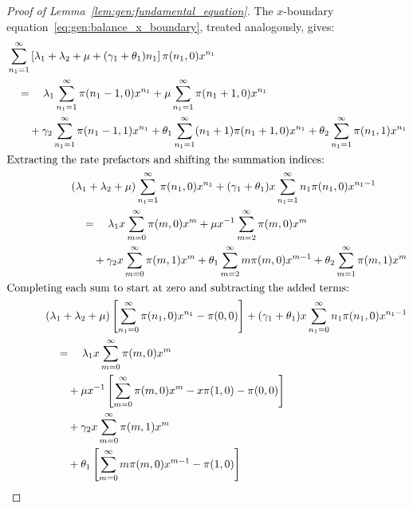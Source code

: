 \begin{proof}[Proof of Lemma~\ref{lem:gen:fundamental_equation}]
    The $x$-boundary equation~\eqref{eq:gen:balance_x_boundary}, treated analogously, gives:
    \begin{align}
        \begin{split}
            & \sum_{n_1=1}^{\infty} \left[ \lambda_1 + \lambda_2 + \mu + (\gamma_1 + \theta_1) n_1 \right] \pi(n_1, 0) x^{n_1} \\
            & \quad = \quad \lambda_1 \sum_{n_1=1}^{\infty} \pi(n_1-1,0) x^{n_1}
            + \mu \sum_{n_1=1}^{\infty} \pi(n_1+1,0) x^{n_1} \\
            & \quad \quad + \gamma_2 \sum_{n_1=1}^{\infty} \pi(n_1-1, 1) x^{n_1}
            + \theta_1 \sum_{n_1=1}^{\infty} (n_1+1) \pi(n_1+1, 0) x^{n_1}
            + \theta_2 \sum_{n_1=1}^{\infty} \pi(n_1, 1) x^{n_1}
        \end{split} \nonumber \\
        \intertext{Extracting the rate prefactors and shifting the summation indices:}
        \begin{split}
            & (\lambda_1 + \lambda_2 + \mu) \sum_{n_1=1}^{\infty} \pi(n_1, 0) x^{n_1}
            + (\gamma_1 + \theta_1) x \sum_{n_1=1}^{\infty} n_1 \pi(n_1, 0) x^{n_1-1} \\
            & \quad = \quad \lambda_1 x \sum_{m=0}^{\infty} \pi(m, 0) x^{m}
            + \mu x^{-1} \sum_{m=2}^{\infty} \pi(m, 0) x^{m} \\
            & \quad \quad + \gamma_2 x \sum_{m=0}^{\infty} \pi(m, 1) x^{m}
            + \theta_1 \sum_{m=2}^{\infty} m \pi(m, 0) x^{m-1}
            + \theta_2 \sum_{m=1}^{\infty} \pi(m, 1) x^{m}
        \end{split} \nonumber \\
        \intertext{Completing each sum to start at zero and subtracting the added terms:}
        \begin{split}
            & (\lambda_1 + \lambda_2 + \mu) \left[ \sum_{n_1=0}^{\infty} \pi(n_1, 0) x^{n_1} - \pi(0,0) \right]
            + (\gamma_1 + \theta_1) x \sum_{n_1=0}^{\infty} n_1 \pi(n_1, 0) x^{n_1-1} \\
            & \quad = \quad \lambda_1 x \sum_{m=0}^{\infty} \pi(m, 0) x^{m} \\
            & \quad \quad + \mu x^{-1} \left[ \sum_{m=0}^{\infty} \pi(m, 0) x^{m} - x \pi(1, 0) - \pi(0,0) \right] \\
            & \quad \quad + \gamma_2 x \sum_{m=0}^{\infty} \pi(m, 1) x^{m} \\
            & \quad \quad + \theta_1 \left[ \sum_{m=0}^{\infty} m \pi(m, 0) x^{m-1} - \pi(1, 0) \right] \\

\end{split}
\end{align}
\end{proof}

